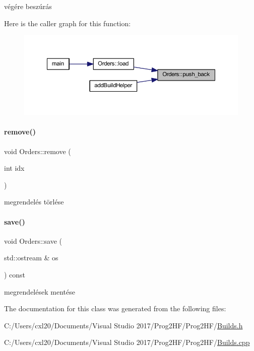 végére beszúrás 

Here is the caller graph for this function\+:
\nopagebreak
\begin{figure}[H]
\begin{center}
\leavevmode
\includegraphics[width=350pt]{class_orders_a6d8d6db032983700fa68cca43dc75a38_icgraph}
\end{center}
\end{figure}
\mbox{\label{class_orders_a36a43f158466760d315ca23ac24bd4bd}} 
\paragraph{\texorpdfstring{remove()}{remove()}}
{\footnotesize\ttfamily void Orders\+::remove (\begin{DoxyParamCaption}\item[{int}]{idx }\end{DoxyParamCaption})}



megrendelés törlése 

\mbox{\label{class_orders_a80770bd5dffc2d83de0e9acfaad14229}} 
\paragraph{\texorpdfstring{save()}{save()}}
{\footnotesize\ttfamily void Orders\+::save (\begin{DoxyParamCaption}\item[{std\+::ostream \&}]{os }\end{DoxyParamCaption}) const}



megrendelések mentése 



The documentation for this class was generated from the following files\+:\begin{DoxyCompactItemize}
\item 
C\+:/\+Users/cxl20/\+Documents/\+Visual Studio 2017/\+Prog2\+H\+F/\+Prog2\+H\+F/\mbox{\hyperlink{_builds_8h}{Builds.\+h}}\item 
C\+:/\+Users/cxl20/\+Documents/\+Visual Studio 2017/\+Prog2\+H\+F/\+Prog2\+H\+F/\mbox{\hyperlink{_builds_8cpp}{Builds.\+cpp}}\end{DoxyCompactItemize}
